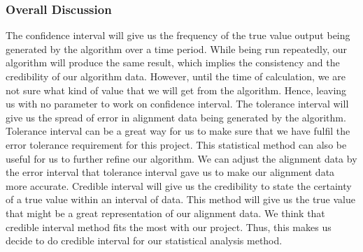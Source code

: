\hfill \break
\subsubsection{Overall Discussion}
The confidence interval will give us the frequency of the true value output being generated by the algorithm over a time period.
While being run repeatedly, our algorithm will produce the same result, which implies the consistency and the credibility of our algorithm data.
However, until the time of calculation, we are not sure what kind of value that we will get from the algorithm.
Hence, leaving us with no parameter to work on confidence interval.
The tolerance interval will give us the spread of error in alignment data being generated by the algorithm.
Tolerance interval can be a great way for us to make sure that we have fulfil the error tolerance requirement for this project.
This statistical method can also be useful for us to further refine our algorithm.
We can adjust the alignment data by the error interval that tolerance interval gave us to make our alignment data more accurate.
Credible interval will give us the credibility to state the certainty of a true value within an interval of data.
This method will give us the true value that might be a great representation of our alignment data.
We think that credible interval method fits the most with our project.
Thus, this makes us decide to do credible interval for our statistical analysis method. 


















